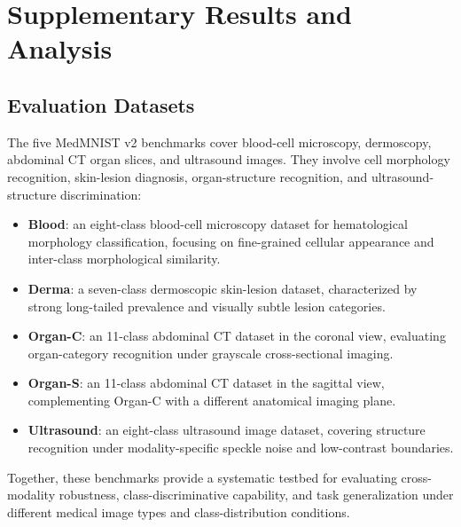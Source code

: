 \documentclass[letterpaper]{article} %
\begin{document}

\appendix
\section{Supplementary Results and Analysis}

\subsection{Evaluation Datasets}

The five MedMNIST v2 benchmarks\cite{yang2023medmnist} cover blood-cell microscopy, dermoscopy, abdominal CT organ slices, and ultrasound images. They involve cell morphology recognition, skin-lesion diagnosis, organ-structure recognition, and ultrasound-structure discrimination:
\begin{itemize}
\item \textbf{Blood}: an eight-class blood-cell microscopy dataset for hematological morphology classification, focusing on fine-grained cellular appearance and inter-class morphological similarity.
\item \textbf{Derma}: a seven-class dermoscopic skin-lesion dataset, characterized by strong long-tailed prevalence and visually subtle lesion categories.
\item \textbf{Organ-C}: an 11-class abdominal CT dataset in the coronal view, evaluating organ-category recognition under grayscale cross-sectional imaging.
\item \textbf{Organ-S}: an 11-class abdominal CT dataset in the sagittal view, complementing Organ-C with a different anatomical imaging plane.
\item \textbf{Ultrasound}: an eight-class ultrasound image dataset, covering structure recognition under modality-specific speckle noise and low-contrast boundaries.
\end{itemize}
Together, these benchmarks provide a systematic testbed for evaluating cross-modality robustness, class-discriminative capability, and task generalization under different medical image types and class-distribution conditions.
\end{document}
